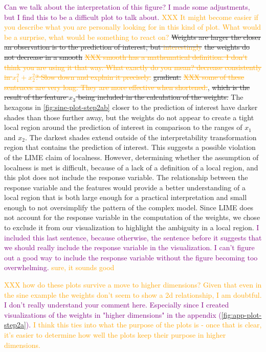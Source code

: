 \documentclass[AMS,STIX2COL]{WileyNJD-v2}\usepackage[]{graphicx}\usepackage[]{color}
\newcommand{\hh}[1]{\textcolor{orange}{#1}}
\newcommand{\kgc}[1]{\textcolor{purple}{#1}}
\begin{document}
{\kgc{Can we talk about the interpretation of this figure? I made some adjustments, but I find this to be a difficult plot to talk about.} \hh{XXX It might become easier if you describe what you are personally looking for in this kind of plot. What would be a surprise, what would be something to react on?}
\sout{Weights are larger the closer an observation is to the prediction of interest, but \hh{interestingly}} \sout{the weights do not decrease in a \sout{smooth}} \hh{\sout{XXX smooth has a mathematical definition. I don't think you are using it that way. What exactly do you mean? decrease consistently in $x_1^2 + x_2^2$? Slow down and explain it precisely.}} \sout{gradient.} \hh{\sout{XXX some of these sentences are very long. They are more effective when shortened.}}, \sout{which is the result of the feature $x_3$ being included in the calculation of the weights.} 
The hexagons in \autoref{fig:sine-plot-step2ab} closer to the prediction of interest have darker shades than those further away, but the weights do not appear to create a tight local region around the prediction of interest in comparison to the ranges of $x_1$ and $x_2$. The darkest shades extend outside of the interpretability transformation region that contains the prediction of interest. This suggests a possible violation of the LIME claim of localness. However, determining whether the assumption of localness is met is difficult, because of a lack of a definition of a local region, and this plot does not include the response variable. The relationship between the response variable and the features would provide a better understanding of a local region that is both large enough for a practical interpretation and small enough to not oversimplify the pattern of the complex model. Since LIME does not account for the response variable in the computation of the weights, we chose to exclude it from our visualization to highlight the ambiguity in a local region. \kgc{I included this last sentence, because otherwise, the sentence before it suggests that we should really include the response variable in the visualization. I can't figure out a good way to include the response variable without the figure becoming too overwhelming.} \hh{sure, it sounds good}

\hh{XXX how do these plots survive a move to higher dimensions? Given that even in the sine example the weights don't seem to show a 2d relationship, I am doubtful.} \kgc{I don't really understand your comment here. Especially since I created visualizations of the weights in "higher dimensions" in the appendix (\autoref{fig:app-plot-step2a}).} \hh{I think this ties into what the purpose of the plots is - once that is clear, it's easier to determine how well the plots keep their purpose in higher dimensions.} 

}
\end{document}
